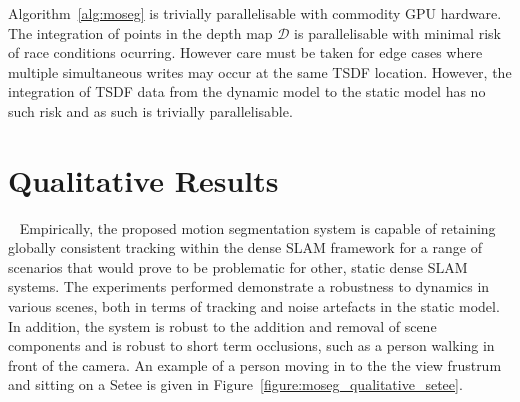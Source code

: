 Algorithm~\ref{alg:moseg} is trivially parallelisable with commodity GPU hardware.
The integration of points in the depth map \( \mathcal{D} \) is parallelisable 
with minimal risk of race conditions ocurring. However care must be taken for edge 
cases where multiple simultaneous writes may occur at the same TSDF location. 
However, the integration of TSDF data from the dynamic model to the static model 
has no such risk and as such is trivially parallelisable.

\section{Qualitative Results}
~\label{sec:moseg_qualitative}
Empirically, the proposed motion segmentation system is capable of retaining
globally consistent tracking within the dense SLAM framework for a range of
scenarios that would prove to be problematic for other, static dense SLAM
systems. The experiments performed demonstrate a robustness	to dynamics in
various scenes, both in terms of tracking and noise artefacts in the static
model. In addition, the system is robust to the addition and removal of scene
components and is robust to short term occlusions, such as a person walking in
front of the camera. An example of a person moving in to the the view frustrum
and sitting on a Setee is given in Figure~\ref{figure:moseg_qualitative_setee}.

